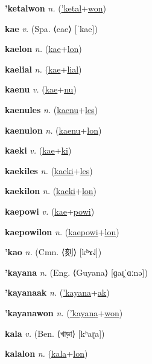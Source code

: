 \textbf{\hypertarget{'ketalwon}{'ketalwon}} \textit{n.} (\hyperlink{'ketal}{'ketal}+\allowbreak \hyperlink{won}{won})


\textbf{\hypertarget{kae}{kae}} \textit{v.} (Spa. ⟨cae⟩ [ˈkae])


\textbf{\hypertarget{kaelon}{kaelon}} \textit{n.} (\hyperlink{kae}{kae}+\allowbreak \hyperlink{lon}{lon})


\textbf{\hypertarget{kaelial}{kaelial}} \textit{n.} (\hyperlink{kae}{kae}+\allowbreak \hyperlink{lial}{lial})


\textbf{\hypertarget{kaenu}{kaenu}} \textit{v.} (\hyperlink{kae}{kae}+\allowbreak \hyperlink{nu}{nu})


\textbf{\hypertarget{kaenules}{kaenules}} \textit{n.} (\hyperlink{kaenu}{kaenu}+\allowbreak \hyperlink{les}{les})


\textbf{\hypertarget{kaenulon}{kaenulon}} \textit{n.} (\hyperlink{kaenu}{kaenu}+\allowbreak \hyperlink{lon}{lon})


\textbf{\hypertarget{kaeki}{kaeki}} \textit{v.} (\hyperlink{kae}{kae}+\allowbreak \hyperlink{ki}{ki})


\textbf{\hypertarget{kaekiles}{kaekiles}} \textit{n.} (\hyperlink{kaeki}{kaeki}+\allowbreak \hyperlink{les}{les})


\textbf{\hypertarget{kaekilon}{kaekilon}} \textit{n.} (\hyperlink{kaeki}{kaeki}+\allowbreak \hyperlink{lon}{lon})


\textbf{\hypertarget{kaepowi}{kaepowi}} \textit{v.} (\hyperlink{kae}{kae}+\allowbreak \hyperlink{powi}{powi})


\textbf{\hypertarget{kaepowilon}{kaepowilon}} \textit{n.} (\hyperlink{kaepowi}{kaepowi}+\allowbreak \hyperlink{lon}{lon})


\textbf{\hypertarget{'kao}{'kao}} \textit{n.} (Cmn. ⟨{\chinese{}刻}⟩ [kʰɤ˨˩])


\textbf{\hypertarget{'kayana}{'kayana}} \textit{n.} (Eng. ⟨Guyana⟩ [ɡaɪ̯ˈɑːnə])


\textbf{\hypertarget{'kayanaak}{'kayanaak}} \textit{n.} (\hyperlink{'kayana}{'kayana}+\allowbreak \hyperlink{ak}{ak})


\textbf{\hypertarget{'kayanawon}{'kayanawon}} \textit{n.} (\hyperlink{'kayana}{'kayana}+\allowbreak \hyperlink{won}{won})


\textbf{\hypertarget{kala}{kala}} \textit{v.} (Ben. ⟨{\bengali{}খাড়া}⟩ [kʰaɽa])


\textbf{\hypertarget{kalalon}{kalalon}} \textit{n.} (\hyperlink{kala}{kala}+\allowbreak \hyperlink{lon}{lon})


